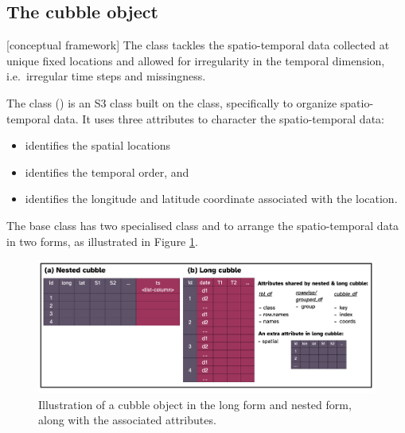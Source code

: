 \documentclass[
  shortnames]{jss}
\providecommand{\tightlist}{%
  \setlength{\itemsep}{0pt}\setlength{\parskip}{0pt}}
\begin{document}
\hypertarget{object}{%
\subsection{The cubble object}\label{object}}

{[}conceptual framework{]} The  class tackles the spatio-temporal data collected at unique fixed locations and allowed for irregularity in the temporal dimension, i.e.~irregular time steps and missingness.

The  class () is an S3 class \citep{advr} built on the  class, specifically to organize spatio-temporal data.
It uses three attributes to character the spatio-temporal data:

\begin{itemize}
\tightlist
\item
   identifies the spatial locations
\item
   identifies the temporal order, and
\item
   identifies the longitude and latitude coordinate associated with the location.
\end{itemize}

The base class  has two specialised class  and  to arrange the spatio-temporal data in two forms, as illustrated in Figure \ref{fig:class}.

\begin{CodeChunk}
\begin{figure}

{\centering \includegraphics[width=1\linewidth]{../figures/diagram-keynotes/diagram-keynotes.007} 

}

\caption[Illustration of a cubble object in the long form and nested form, along with the associated attributes]{Illustration of a cubble object in the long form and nested form, along with the associated attributes.}\label{fig:class}
\end{figure}
\end{CodeChunk}
\end{document}

